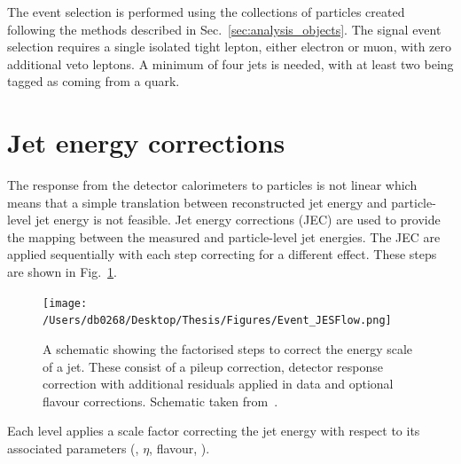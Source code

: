 The event selection is performed using the collections of particles created following the methods described in Sec.~\ref{sec:analysis_objects}.
The signal event selection requires a single isolated tight lepton, either electron or muon, with zero additional veto leptons.
A minimum of four jets is needed, with at least two being tagged as coming from a \bquark{} quark.


\section{Jet energy corrections} %
\label{sub:jet_energy_corrections}

The response from the detector calorimeters to particles is not linear which means that a simple translation between reconstructed jet energy and particle-level jet energy is not feasible.
Jet energy corrections (JEC) are used to provide the mapping between the measured and particle-level jet energies.
The JEC are applied sequentially with each step correcting for a different effect. 
These steps are shown in Fig.~\ref{fig:JESFlow}.
\begin{figure}[htpb]
	\centering
	\texttt{[image: /Users/db0268/Desktop/Thesis/Figures/Event\_JESFlow.png]}
	\caption[A schematic showing the factorised steps to correct the energy scale of a jet. These consist of a pileup correction, detector response correction with additional residuals applied in data and optional flavour corrections.]{A schematic showing the factorised steps to correct the energy scale of a jet. These consist of a pileup correction, detector response correction with additional residuals applied in data and optional flavour corrections. Schematic taken from~\cite{Event:JEC}.}
	\label{fig:JESFlow}
\end{figure}
Each level applies a scale factor correcting the jet energy with respect to its associated parameters (\pt{}, $\eta$, flavour, \etc{}).

